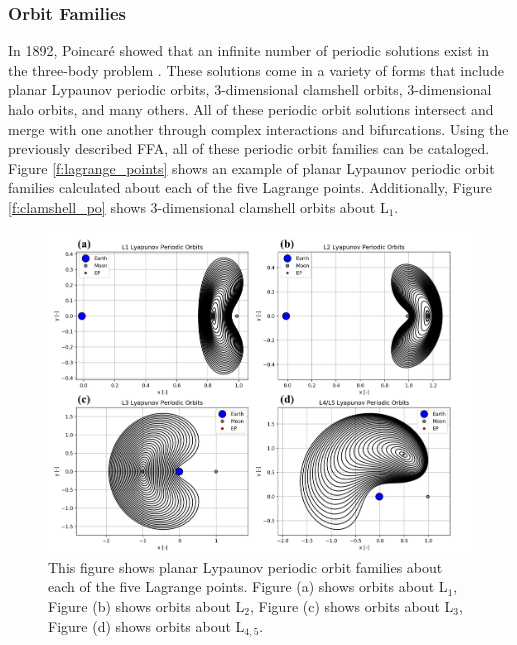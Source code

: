 \documentclass[11pt]{article} %
\begin{document}
\subsubsection{Orbit Families}
In 1892, Poincar\'{e} showed that an infinite number of periodic solutions exist in the three-body problem \cite{BarrowGreen1994}. These solutions come in a variety of forms that include planar Lypaunov periodic orbits, 3-dimensional clamshell orbits, 3-dimensional halo orbits, and many others. All of these periodic orbit solutions intersect and merge with one another through complex interactions and bifurcations. Using the previously described FFA, all of these periodic orbit families can be cataloged. Figure \ref{f:lagrange_points} shows an example of planar Lypaunov periodic orbit families calculated about each of the five Lagrange points. Additionally, Figure \ref{f:clamshell_po} shows 3-dimensional clamshell orbits about L$_1$. 

\begin{figure}[H]
    \centering
    \includegraphics[width=\textwidth]{lyapunov_po_comb.png}
    \caption{This figure shows planar Lypaunov periodic orbit families about each of the five Lagrange points. Figure (a) shows orbits about L$_1$, Figure (b) shows orbits about L$_2$, Figure (c) shows orbits about L$_3$, Figure (d) shows orbits about L$_{4,5}$.}
    \label{f:lyapunov_po}
\end{figure}
\end{document}
